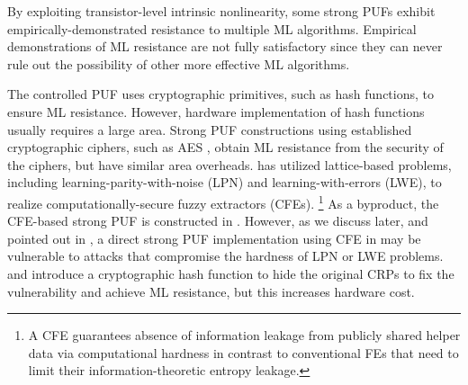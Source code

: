 By exploiting transistor-level intrinsic nonlinearity, some strong PUFs \cite{kumar2014design, zhuang2019strong} exhibit empirically-demonstrated resistance to multiple ML algorithms. 
Empirical demonstrations of ML resistance are not fully satisfactory since they can never rule out the possibility of other more effective ML algorithms. 

The controlled PUF \cite{gassend2008controlled} uses cryptographic primitives, such as hash functions, to ensure ML resistance. However, hardware implementation of hash functions usually requires a large area.
Strong PUF constructions using established cryptographic ciphers, such as AES \cite{bhargava2014efficient}, obtain ML resistance from the security of the ciphers, but have similar area overheads. \cite{fuller2013computational} has utilized lattice-based problems, including learning-parity-with-noise (LPN) and learning-with-errors (LWE), to realize computationally-secure fuzzy extractors (CFEs).
\footnote{A CFE guarantees absence of information leakage from publicly shared helper data via computational hardness in contrast to conventional FEs that need to limit their information-theoretic entropy leakage.} %
As a byproduct, the CFE-based strong PUF is constructed in \cite{herder2017trapdoor,jin2017fpga}.
However, as we discuss later, and pointed out in \cite{herder2017trapdoor,jin2017fpga}, a direct strong PUF implementation using CFE in \cite{fuller2013computational} may be vulnerable to attacks that compromise the hardness of LPN or LWE problems. 
\cite{herder2017trapdoor} and \cite{jin2017fpga} introduce a cryptographic hash function to hide the original CRPs to fix the vulnerability and achieve ML resistance, but this increases hardware cost.


